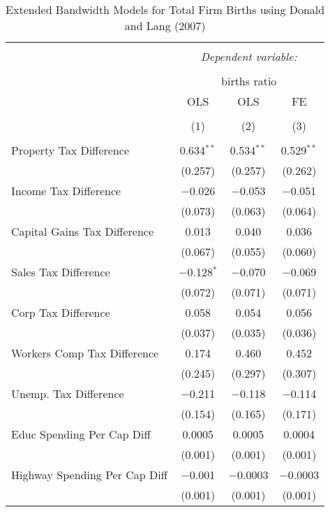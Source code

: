 
\begin{table}[!htbp] \centering 
  \caption{Extended Bandwidth Models for  Total Firm Births using Donald and Lang (2007)} 
  \label{} 
\begin{tabular}{@{\extracolsep{5pt}}lccc} 
\\[-1.8ex]\hline 
\hline \\[-1.8ex] 
 & \multicolumn{3}{c}{\textit{Dependent variable:}} \\ 
\cline{2-4} 
\\[-1.8ex] & \multicolumn{3}{c}{births ratio} \\ 
 & OLS & OLS & FE \\ 
\\[-1.8ex] & (1) & (2) & (3)\\ 
\hline \\[-1.8ex] 
 Property Tax Difference & 0.634$^{**}$ & 0.534$^{**}$ & 0.529$^{**}$ \\ 
  & (0.257) & (0.257) & (0.262) \\ 
  Income Tax Difference & $-$0.026 & $-$0.053 & $-$0.051 \\ 
  & (0.073) & (0.063) & (0.064) \\ 
  Capital Gains Tax Difference & 0.013 & 0.040 & 0.036 \\ 
  & (0.067) & (0.055) & (0.060) \\ 
  Sales Tax Difference & $-$0.128$^{*}$ & $-$0.070 & $-$0.069 \\ 
  & (0.072) & (0.071) & (0.071) \\ 
  Corp Tax Difference & 0.058 & 0.054 & 0.056 \\ 
  & (0.037) & (0.035) & (0.036) \\ 
  Workers Comp Tax Difference & 0.174 & 0.460 & 0.452 \\ 
  & (0.245) & (0.297) & (0.307) \\ 
  Unemp. Tax Difference & $-$0.211 & $-$0.118 & $-$0.114 \\ 
  & (0.154) & (0.165) & (0.171) \\ 
  Educ Spending Per Cap Diff & 0.0005 & 0.0005 & 0.0004 \\ 
  & (0.001) & (0.001) & (0.001) \\ 
  Highway Spending Per Cap Diff & $-$0.001 & $-$0.0003 & $-$0.0003 \\ 
  & (0.001) & (0.001) & (0.001) \\ 

\end{tabular}
\end{table}
